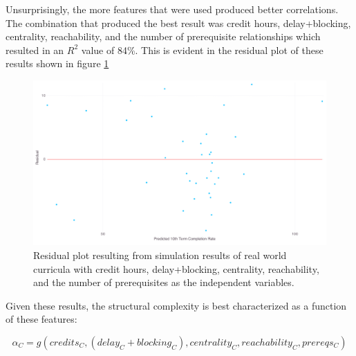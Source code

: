 \documentclass[botnum, fleqn]{unmeethesis}
\begin{document}
      Unsurprisingly, the more features that were used produced better correlations. The combination that produced the best result was credit hours, delay+blocking, centrality, reachability, and the number of prerequisite relationships which resulted in an $R^2$ value of 84\%. This is evident in the residual plot of these results shown in figure \ref{fig:bestfit} 


      \begin{figure}[h!]
        \centerline{\includegraphics[scale=0.25]{./figures/complexity_optimal_residual.png}}
        \caption{Residual plot resulting from simulation results of real world curricula with credit hours, delay+blocking, centrality, reachability, and the number of prerequisites as the independent variables.}
        \label{fig:bestfit}
      \end{figure}

      Given these results, the structural complexity is best characterized as a function of these features:

      \begin{small}
      \[
        \alpha_C = g(credits_C, (delay_C+blocking_C), centrality_C, reachability_C, prereqs_C)
      \]
      \end{small}




\end{document}

